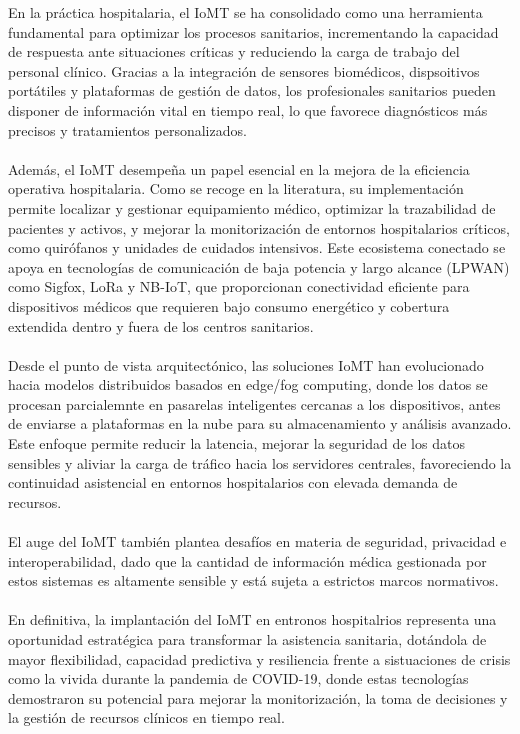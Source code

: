 En la práctica hospitalaria, el IoMT se ha consolidado como una herramienta fundamental para optimizar los procesos sanitarios, incrementando la capacidad de respuesta ante situaciones
críticas y reduciendo la carga de trabajo del personal clínico. Gracias a la integración de sensores biomédicos, dispsoitivos portátiles y plataformas de gestión de datos, 
los profesionales sanitarios pueden disponer de información vital en tiempo real, lo que favorece diagnósticos más precisos y tratamientos personalizados. \\ \\

Además, el IoMT desempeña un papel esencial en la mejora de la eficiencia operativa hospitalaria. Como se recoge en la literatura, su implementación permite localizar y gestionar
equipamiento médico, optimizar la trazabilidad de pacientes y activos, y mejorar la monitorización de entornos hospitalarios críticos, como quirófanos y unidades de cuidados intensivos.
Este ecosistema conectado se apoya en tecnologías de comunicación de baja potencia y largo alcance (LPWAN) como Sigfox, LoRa y NB-IoT, que proporcionan conectividad eficiente para
dispositivos médicos que requieren bajo consumo energético y cobertura extendida dentro y fuera de los centros sanitarios. \\ \\

Desde el punto de vista arquitectónico, las soluciones IoMT han evolucionado hacia modelos distribuidos basados en edge/fog computing, donde los datos se procesan parcialemnte
en pasarelas inteligentes cercanas a los dispositivos, antes de enviarse a plataformas en la nube para su almacenamiento y análisis avanzado. Este enfoque permite reducir la 
latencia, mejorar la seguridad de los datos sensibles y aliviar la carga de tráfico hacia los servidores centrales, favoreciendo la continuidad asistencial en entornos hospitalarios
con elevada demanda de recursos. \\ \\

El auge del IoMT también plantea desafíos en materia de seguridad, privacidad e interoperabilidad, dado que la cantidad de información médica gestionada por estos sistemas es altamente 
sensible y está sujeta a estrictos marcos normativos. \\ \\

En definitiva, la implantación del IoMT en entronos hospitalrios representa una oportunidad estratégica para transformar la asistencia sanitaria, dotándola de mayor flexibilidad, 
capacidad predictiva y resiliencia frente a sistuaciones de crisis como la vivida durante la pandemia de COVID-19, donde estas tecnologías demostraron su potencial para mejorar la 
monitorización, la toma de decisiones y la gestión de recursos clínicos en tiempo real.
